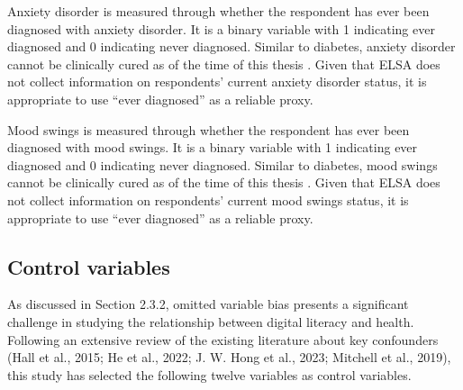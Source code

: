 Anxiety disorder is measured through whether the respondent has ever been diagnosed with anxiety disorder. It is a binary variable with 1 indicating ever diagnosed and 0 indicating never diagnosed. Similar to diabetes, anxiety disorder cannot be clinically cured as of the time of this thesis \parencite{nhs_overview_2022}. Given that ELSA does not collect information on respondents' current anxiety disorder status, it is appropriate to use ``ever diagnosed” as a reliable proxy.

Mood swings is measured through whether the respondent has ever been diagnosed with mood swings. It is a binary variable with 1 indicating ever diagnosed and 0 indicating never diagnosed. Similar to diabetes, mood swings cannot be clinically cured as of the time of this thesis \parencite[p. 28]{farrell_it_2010}. Given that ELSA does not collect information on respondents' current mood swings status, it is appropriate to use ``ever diagnosed” as a reliable proxy.

\subsection{Control variables}
As discussed in Section 2.3.2, omitted variable bias presents a significant challenge in studying the relationship between digital literacy and health. Following an extensive review of the existing literature about key confounders (Hall et al., 2015; He et al., 2022; J. W. Hong et al., 2023; Mitchell et al., 2019), this study has selected the following twelve variables as control variables.

